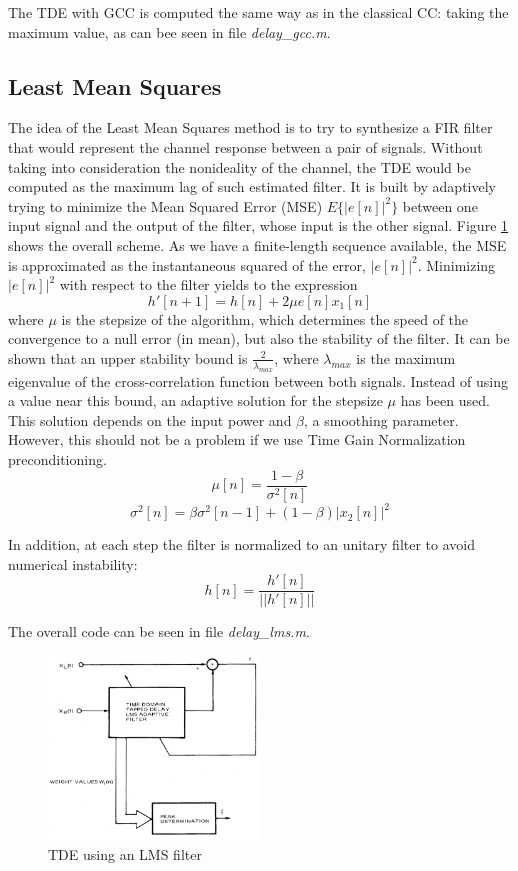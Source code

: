 The TDE with GCC is computed the same way as in the classical CC: taking the maximum value, as can bee seen in file \emph{delay\_gcc.m}\cite{delaygcc}.

\subsection{Least Mean Squares}
The idea of the Least Mean Squares method is to try to synthesize a FIR filter that would represent the channel response between a pair of signals. Without taking into consideration the nonideality of the channel, the TDE would be computed as the maximum lag of such estimated filter. It is built by adaptively trying to minimize the Mean Squared Error (MSE) $E\{|e[n]|^2\}$ between one input signal and the output of the filter, whose input is the other signal. Figure \ref{fig:LMS} shows the overall scheme. As we have a finite-length sequence available, the MSE is approximated as the instantaneous squared of the error, $|e[n]|^2$. Minimizing $|e[n]|^2$ with respect to the filter yields to the expression
$$ h'[n+1] = h[n] + 2 \mu e[n] x_1[n] $$
where $\mu$ is the stepsize of the algorithm, which determines the speed of the convergence to a null error (in mean), but also the stability of the filter. It can be shown that an upper stability bound is $\frac{2}{\lambda_{max}}$, where $\lambda_{max}$ is the maximum eigenvalue of the cross-correlation function between both signals. Instead of using a value near this bound, an adaptive solution for the stepsize $\mu$ has been used. This solution depends on the input power and $\beta$, a smoothing parameter. However, this should not be a problem if we use Time Gain Normalization preconditioning.
$$ \mu[n] = \frac{1-\beta}{\sigma^2[n]} $$
$$ \sigma^2[n] = \beta \sigma^2[n-1] + (1-\beta)|x_2[n]|^2 $$

In addition, at each step the filter is normalized to an unitary filter to avoid numerical instability:
$$ h[n] = \frac{h'[n]}{||h'[n]||} $$

The overall code can be seen in file \emph{delay\_lms.m}\cite{delaylms}.

\begin{figure}[htb]
	\begin{center}
		\includegraphics[width=0.5\textwidth]{figures/LMS.png}
	\end{center}
	\caption{TDE using an LMS filter}
	\label{fig:LMS}
\end{figure}


